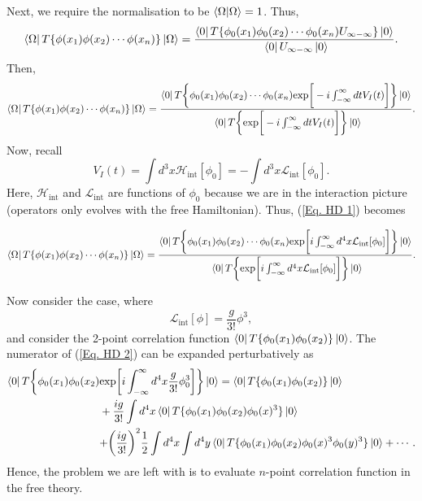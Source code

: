 \documentclass[11pt]{article}
\theoremstyle{definition}
\begin{document}
Next, we require the normalisation to be $\braket{\Omega}{\Omega} = 1$. Thus,
\begin{equation}
    \bra{\Omega}T\{\phi(x_1) \phi(x_2) \cdots  \phi(x_n)\}\ket{\Omega} = \frac{\bra{0}T\{\phi_0(x_1)\phi_0(x_2) \cdots \phi_0(x_n) U_{\infty-\infty}\}\ket{0}}{\ \bra{0}U_{\infty-\infty}\ket{0}}.
\end{equation}
Then, 
\begin{equation}
    \bra{\Omega}T\{\phi(x_1) \phi(x_2) \cdots  \phi(x_n)\}\ket{\Omega} = \frac{\bra{0}T\biggr\{\phi_0(x_1)\phi_0(x_2) \cdots \phi_0(x_n) \text{exp}\biggr[-i\int^{\infty}_{-\infty} dt V_I(t)\biggr]\biggr \}\ket{0}}{\ \bra{0}T\biggr \{ \text{exp}\biggr[-i\int^{\infty}_{-\infty} dt V_I(t)\biggr]\biggr\}\ket{0}}.
    \label{Eq. HD 1}
\end{equation}
Now, recall
\begin{equation}
    V_I(t) = \int d^3x \mathcal{H}_{\text{int}}[\phi_0] = -\int d^3x \mathcal{L}_{\text{int}}[\phi_0].
\end{equation}
Here, $\mathcal{H}_{\text{int}}$ and $\mathcal{L}_{\text{int}}$ are functions of $\phi_0$ because we are in the interaction picture (operators only evolves with the free Hamiltonian). Thus, (\ref{Eq. HD 1}) becomes
\begin{shaded}
    \begin{equation}
        \bra{\Omega}T\{\phi(x_1) \phi(x_2) \cdots  \phi(x_n)\}\ket{\Omega} = \frac{\bra{0}T\biggr\{\phi_0(x_1)\phi_0(x_2) \cdots \phi_0(x_n) \text{exp}\biggr[i\int^{\infty}_{-\infty} d^4x \mathcal{L}_{\text{int}}[\phi_0]\biggr]\biggr \}\ket{0}}{\ \bra{0}T\biggr \{ \text{exp}\biggr[i\int^{\infty}_{-\infty} d^4x \mathcal{L}_{\text{int}}[\phi_0]\biggr]\biggr\}\ket{0}}.
        \label{Eq. HD 2}
    \end{equation}
\end{shaded}
Now consider the case, where
\begin{equation}
    \mathcal{L}_{\text{int}}[\phi] = \frac{g}{3!}\phi^3,
\end{equation}
and consider the 2-point correlation function $\bra{0}T\{\phi_0(x_1)\phi_0(x_2)\}\ket{0}$. The numerator of (\ref{Eq. HD 2}) can be expanded perturbatively as
\begin{equation}
    \begin{aligned}
        \bra{0}T\biggr\{\phi_0(x_1)\phi_0(x_2) &\text{exp}\biggr[i\int^{\infty}_{-\infty} d^4x \frac{g}{3!}\phi_0^3\biggr]\biggr \}\ket{0} = \bra{0}T\{\phi_0(x_1)\phi_0(x_2)\}\ket{0}\\
        &+ \frac{ig}{3!}\int d^4x \bra{0}T\{\phi_0(x_1)\phi_0(x_2)\phi_0(x)^3\}\ket{0}\\
        &+ \biggr(\frac{ig}{3!}\biggr)^2\frac{1}{2}\int d^4x \int d^4y \bra{0}T\{\phi_0(x_1)\phi_0(x_2)\phi_0(x)^3\phi_0(y)^3\}\ket{0} + \cdots.
    \label{Eq. HD expansion}
    \end{aligned}
\end{equation}
Hence, the problem we are left with is to evaluate $n$-point correlation function in the free theory.
\end{document}
